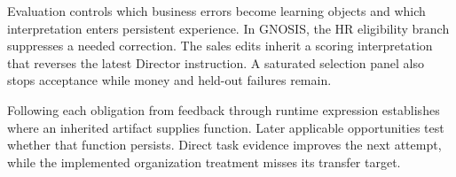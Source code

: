 \documentclass{ecai}
\begin{document}
Evaluation controls which business errors become learning objects and which interpretation enters persistent experience. In GNOSIS, the HR eligibility branch suppresses a needed correction. The sales edits inherit a scoring interpretation that reverses the latest Director instruction. A saturated selection panel also stops acceptance while money and held-out failures remain.

Following each obligation from feedback through runtime expression establishes where an inherited artifact supplies function. Later applicable opportunities test whether that function persists. Direct task evidence improves the next attempt, while the implemented organization treatment misses its transfer target.

\balance

\end{document}
